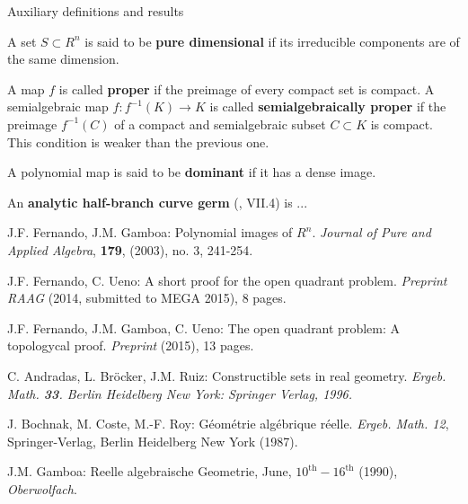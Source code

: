 \documentclass[11pt, a4paper, english, twoside, notitlepage]{report}
\begin{document}
\begin{chapter}{Auxiliary definitions and results}
\begin{definition}\label{pureDim}
	A set $S \subset R^n$ is said to be \textbf{pure dimensional} if its irreducible components are of the same dimension.
\end{definition}

\begin{definition}\label{properMap}
	A map $f$ is called \textbf{proper} if the preimage of every compact set is compact. A semialgebraic map $f: f^{-1}(K) \longrightarrow K$ is called \textbf{semialgebraically proper} if the preimage $f^{-1}(C)$ of a compact and semialgebraic subset $C \subset K$ is compact. This condition is weaker than the previous one.
\end{definition}

\begin{definition}\label{dominant}
	A polynomial map is said to be \textbf{dominant} if it has a dense image. 
\end{definition}

\begin{definition}\label{curveGerms}
	An \textbf{analytic half-branch curve germ} (\cite{bcr}, VII.4) is ... 
\end{definition}

\end{chapter}


\begin{thebibliography}{10}

 J.F. Fernando, J.M. Gamboa: Polynomial images of $R^n$.
\textit{Journal of Pure and Applied Algebra}, {\bf 179}, (2003), no. 3, 241-254.

 J.F. Fernando, C. Ueno: A short proof for the open quadrant problem.
\textit{Preprint RAAG} (2014, submitted to MEGA 2015), 8 pages.

 J.F. Fernando, J.M. Gamboa, C. Ueno: The open quadrant problem:
A topologycal proof. \textit{Preprint} (2015), 13 pages.

 C. Andradas, L. Br\"ocker, J.M. Ruiz: Constructible 
sets in real geometry.  \em Ergeb.  Math.  \em {\bf 33}.  Berlin Heidelberg 
New York: Springer Verlag, 1996.

 J. Bochnak, M. Coste, M.-F. Roy: G\'eom\'etrie
alg\'ebrique r\'eelle. {\em Ergeb. Math. 12}, Springer-Verlag,
Berlin Heidelberg New York (1987).

 J.M. Gamboa: Reelle algebraische Geometrie, June,
$10^{\text{th}}-16^{\text{th}}$ (1990), \textit{Oberwolfach}.

\end{thebibliography}
\end{document}
